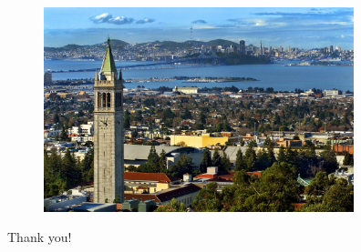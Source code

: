 \documentclass[10pt]{beamer}
\begin{document}
\begin{frame}
\begin{figure}
\includegraphics[width=9cm]{../Figures/berkeley.jpg}
\end{figure}
\centering
Thank you!

\footnotesize
\color{white}\cite{mori,waata,seker,espel,sanchez,cardoni,ivanov,travleev,espel_2013,ivanov_2013,daeubler,ivanov_2014,daeubler_2015,henry,aviles,li_2013,suikkanen,wu,hu,vazquez,meplan,aufiero,aufiero_2017,krolikowski,aufiero_2016,pham,novak,guo,scarlat,yexin,gurecky,sjenitzer,breitkreutz,gill,erfaninia,bennett,gourbesville,guo_2013,hoogenboom,kelly,laureau,smure,pecchia,shan,li_2012,kotlyar_2011,tuominen, guo_2018,cui,chen}
\color{black}
\end{frame}

\appendix

\begin{frame}[allowframebreaks]
\footnotesize


\end{frame}
\end{document}
